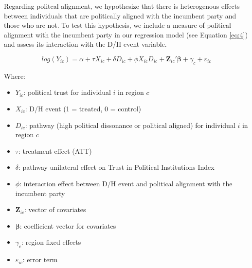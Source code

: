 \documentclass{article}
\begin{document}

Regarding politcal alignment, we hypothesize that there is heterogenous effects between individuals that are politically aligned with the incumbent party and those who are not. To test this hypothesis, we include a measure of political alignment with the incumbent party in our regression model (see Equation \ref{eq:4}) and assess its interaction with the D/H event variable.

\begin{equation}
  \label{eq:4}
  log(Y_{ic}) = \alpha + \tau X_{ic} + \delta D_{ic} + \phi X_{ic}D_{ic} + \mathbf{Z}_{ic}'\mathbf{\beta} + \gamma_c + \varepsilon_{ic}
  \end{equation}
  
  Where:
  \begin{itemize}
    \item \( Y_{ic} \): political trust for individual \( i \) in region \( c \)
    \item \( X_{ic} \): D/H event (1 = treated, 0 = control)
    \item \( D_{ic} \): pathway (high political dissonance or political aligned) for individual \( i \) in region \( c \)
    \item \( \tau \): treatment effect (ATT)
    \item \( \delta \): pathway unilateral effect on Trust in Political Institutions Index
    \item \( \phi \): interaction effect between D/H event and political alignment with the incumbent party
    \item \( \mathbf{Z}_{ic} \): vector of covariates
    \item \( \mathbf{\beta} \): coefficient vector for covariates
    \item \( \gamma_c \): region fixed effects
    \item \( \varepsilon_{ic} \): error term
  \end{itemize}
\end{document}
